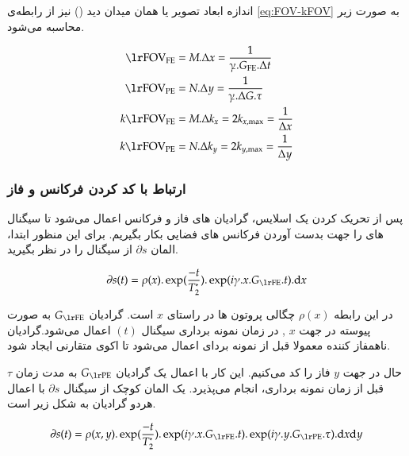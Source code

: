 اندازه ابعاد تصویر یا همان میدان دید ()
نیز از رابطه‌ی  \ref{eq:FOV-kFOV}
به صورت زیر محاسبه می‌شود.

\removevspace
\begin{subequations}\label{eq:fov-res-kspace}
\begin{align}
	\lrtext{FOV}_{\mathrm{FE}} &= M . \Delta x = \dfrac{1}{\gammabar . G_\mathrm{FE} . \Delta t} \\ 
	\lrtext{FOV}_{\mathrm{PE}} &= N . \Delta y = \dfrac{1}{\gammabar . \Delta G . \tau} \\
	k\lrtext{FOV}_{\mathrm{FE}} &= M . \Delta k_x = 2 k_{x, \max} = \frac{1}{\Delta x}\\
	k\lrtext{FOV}_{\mathrm{PE}} &= N . \Delta k_y = 2 k_{y, \max} = \frac{1}{\Delta y}
\end{align}
\end{subequations}

\FloatBarrier
\subsubsection{ارتباط \kspace با کد کردن فرکانس و فاز}
پس از تحریک کردن یک اسلایس، گرادیان های فاز و فرکانس اعمال می‌شود تا سیگنال های \mr را جهت بدست آوردن فرکانس های فضایی بکار بگیریم. برای این منظور ابتدا، المان  $\partial s$  از سیگنال را در نظر بگیرید. 

\removevspace
\begin{equation}\label{eq:element-fe}
	\mathbf{\partial} s(t) = \rho(x) . \exp(\frac{-t}{T_2^*}) .  \exp(i\gamma.x.G_{\lrtext{FE}}.t). \mathrm{d}x
\end{equation}

در این رابطه $\rho(x)$
چگالی پروتون ها در راستای $x$ است. گرادیان $G_{\lrtext{FE}}$ به صورت پیوسته در جهت $x$ , در زمان نمونه برداری سیگنال $(t)$ اعمال می‌شود.گرادیان ناهمفاز کننده معمولا قبل از نمونه بردای اعمال می‌شود تا اکوی متقارنی ایجاد شود.

حال در جهت $y$ فاز را کد می‌کنیم. این کار با اعمال یک گرادیان $G_{\lrtext{PE}}$
به مدت زمان $\tau$ قبل از زمان نمونه برداری، انجام می‌پذیرد. یک المان کوچک از سیگنال $\partial s$ با اعمال هردو گرادیان به شکل زیر است.


\removevspace
 \begin{equation}\label{eq:element-fe-pe}
 		\mathbf{\partial} s(t) = \rho(x,y) . \exp(\frac{-t}{T_2^*}) .  \exp(i\gamma.x.G_{\lrtext{FE}}.t).  \exp(i\gamma.y.G_{\lrtext{PE}}.\tau). \mathrm{d}x \mathrm{d}y
 \end{equation}


